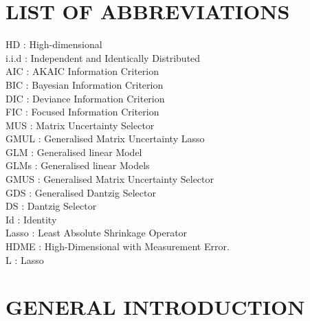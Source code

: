 \documentclass[a4paper,12pt,openany]{report}
\theoremstyle{plain}
\theoremstyle{plain}
\theoremstyle{plain}
\theoremstyle{plain}
\theoremstyle{plain}
\theoremstyle{plain}
\theoremstyle{plain}
\theoremstyle{plain}
\theoremstyle{plain}
\theoremstyle{plain}
\theoremstyle{plain}
\theoremstyle{plain}
\begin{document}
	
	\newpage
	\renewcommand{\contentsname}{TABLE OF CONTENTS}
	\tableofcontents
	
	\newpage
	\listoftables{}
	
	\newpage
	\listoffigures{}
	
		\chapter*{LIST OF ABBREVIATIONS}
	\noindent
	HD : High-dimensional\\
	i.i.d : Independent and Identically Distributed\\
AIC : AKAIC Information Criterion\\
BIC : Bayesian Information Criterion\\
DIC : Deviance Information Criterion\\
FIC : Focused Information Criterion\\
MUS : Matrix Uncertainty Selector\\
GMUL : Generalised Matrix Uncertainty Lasso\\
GLM : Generalised linear Model\\
GLMs : Generalised linear Models\\
GMUS : Generalised Matrix Uncertainty Selector\\
GDS : Generalised Dantzig Selector\\
DS : Dantzig Selector\\
Id : Identity\\
Lasso : Least Absolute Shrinkage Operator\\
HDME : High-Dimensional with Measurement Error.\\
L : Lasso	
	\chapter{GENERAL INTRODUCTION}
\end{document}
